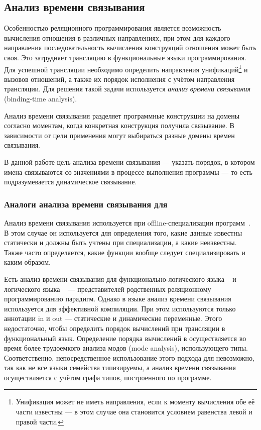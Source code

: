\subsection{Анализ времени связывания}

Особенностью реляционного программирования является возможность вычисления отношения в различных направлениях, при этом для каждого направления последовательность вычисления конструкций отношения может быть своя.
Это затрудняет трансляцию в функциональные языки программирования.
Для успешной трансляции необходимо определить направления унификаций\footnote{Унификация может не иметь направления, если к моменту вычисления обе её части известны --- в этом случае она становится условием равенства левой и правой части.} и вызовов отношений, а также их порядок исполнения с учётом направления трансляции.
Для решения такой задачи используется \textit{анализ времени связывания} (binding-time analysis). 

Анализ времени связывания разделяет программные конструкции на домены согласно моментам, когда конкретная конструкция получила связывание.
В зависимости от цели применения могут выбираться разные домены времен связывания.

В данной работе цель анализа времени связывания --- указать порядок, в котором имена связываются со значениями в процессе выполнения программы --- то есть подразумевается динамическое связывание.

\subsubsection{Аналоги анализа времени связывания для \miniKanren{}}

Анализ времени связывания используется при offline-специализации программ~\cite{jones1993partial}. 
В этом случае он используется для определения того, какие данные известны статически и должны быть учтены при специализации, а какие неизвестны. 
Также часто определяется, какие функции вообще следует специализировать и каким образом. 

Есть анализ времени связывания для функционально-логического языка \mercury{}~\cite{vanhoof2004binding} и логического языка \prolog{}~\cite{leuschel2004prolog} --- представителей родственных реляционному программированию парадигм.
Однако в языке \mercury{} анализ времени связывания~\cite{vanhoof2004binding} используется для эффективной компиляции. 
При этом используются только аннотации in и out --- статические и динамические переменные. 
Этого недостаточно, чтобы определить порядок вычислений при трансляции в функциональный язык.
Определение порядка вычислений в \mercury{} осуществляется во время более трудоемкого анализа модов (mode analysis), использующего типы.
Соответственно, непосредственное использование этого подхода для \miniKanren{} невозможно, так как не все языки семейства типизируемы, а анализ времени связывания \mercury{} осуществляется с учётом графа типов, построенного по программе. 

